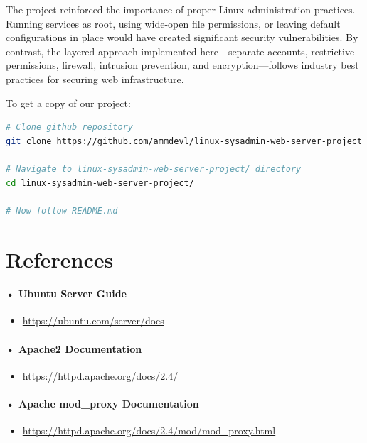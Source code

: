 \documentclass[12pt,a4paper]{report}
\begin{document}
The project reinforced the importance of proper Linux administration practices. Running services as root, using wide-open file permissions, or leaving default configurations in place would have created significant security vulnerabilities. By contrast, the layered approach implemented here---separate accounts, restrictive permissions, firewall, intrusion prevention, and encryption---follows industry best practices for securing web infrastructure.
\vspace{1.0cm}

To get a copy of our project:
\begin{lstlisting}[language=bash]
# Clone github repository
git clone https://github.com/ammdevl/linux-sysadmin-web-server-project

# Navigate to linux-sysadmin-web-server-project/ directory
cd linux-sysadmin-web-server-project/

# Now follow README.md
\end{lstlisting}
\newpage

\section{References}

\paragraph{• Ubuntu Server Guide}
\begin{itemize}[leftmargin=2em]
    \item \url{https://ubuntu.com/server/docs}
\end{itemize}

\paragraph{• Apache2 Documentation}
\begin{itemize}[leftmargin=2em]
    \item \url{https://httpd.apache.org/docs/2.4/}
\end{itemize}

\paragraph{• Apache mod\_proxy Documentation}
\begin{itemize}[leftmargin=2em]
    \item \url{https://httpd.apache.org/docs/2.4/mod/mod_proxy.html}
\end{itemize}
\end{document}
